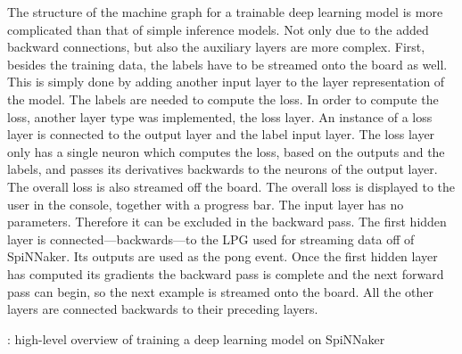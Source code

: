 \documentclass[]{article}
\begin{document}
The structure of the machine graph for a trainable deep learning
model is more complicated than that of simple inference models.
Not only due to the added backward connections, but also the
auxiliary layers are more complex.
First, besides the training data, the labels have to be streamed onto
the board as well.
This is simply done by adding another input layer to the layer
representation of the model.
The labels are needed to compute the loss.
In order to compute the loss, another layer type was implemented,
the loss layer.
An instance of a loss layer is connected to the output layer and the
label input layer.
The loss layer only has a single neuron which computes the loss,
based on the outputs and the labels, and passes its derivatives
backwards to the neurons of the output layer.
The overall loss is also streamed off the board.
The overall loss is displayed to the user in the console, together
with a progress bar.
The input layer has no parameters.
Therefore it can be excluded in the backward pass.
The first hidden layer is connected---backwards---to the LPG used
for streaming data off of SpiNNaker.
Its outputs are used as the pong event.
Once the first hidden layer has computed its gradients the backward
pass is complete and the next forward pass can begin, so the next
example is streamed onto the board.
All the other layers are connected backwards to their preceding
layers.

\begin{algorithm} %
  \caption{: high-level overview of training a deep learning model on
    SpiNNaker}
  \label{alg:backprop}

  \begin{algorithmic}[1]
        \ENDIF
        \ENDIF
      \ENDFOR
    \ENDFOR
  \end{algorithmic}
\end{algorithm} %
\end{document}
